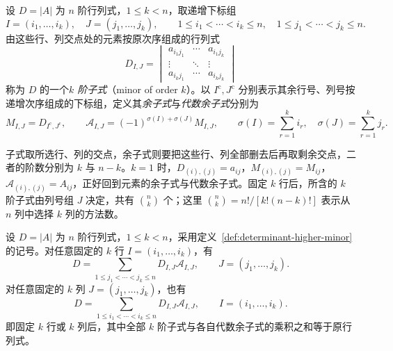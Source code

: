 \begin{definition}
\label{def:determinant-higher-minor}
设 $D=|A|$ 为 $n$ 阶行列式，$1\leq k<n$，取递增下标组
\[
    I=(i_1,\ldots,i_k),\quad J=(j_1,\ldots,j_k),\qquad
    1\leq i_1<\cdots<i_k\leq n,\quad
    1\leq j_1<\cdots<j_k\leq n.
\]
由这些行、列交点处的元素按原次序组成的行列式
\[
    D_{I,J}=\begin{vmatrix}
        a_{i_1j_1}&\cdots&a_{i_1j_k}\\
        \vdots&\ddots&\vdots\\
        a_{i_kj_1}&\cdots&a_{i_kj_k}
    \end{vmatrix}
\]
称为 $D$ 的一个\emph{$k$ 阶子式}（minor of order $k$）。以 $I^{\mathrm c},J^{\mathrm c}$ 分别表示其余行号、列号按递增次序组成的下标组，定义其\emph{余子式}与\emph{代数余子式}分别为
\begin{equation}
\label{eq:determinant-higher-cofactor}
    M_{I,J}=D_{I^{\mathrm c},J^{\mathrm c}},\qquad
    \mathcal A_{I,J}=(-1)^{\sigma(I)+\sigma(J)}M_{I,J},
    \qquad \sigma(I)=\sum_{r=1}^{k}i_r,\quad
           \sigma(J)=\sum_{r=1}^{k}j_r.
\end{equation}
\end{definition}

子式取所选行、列的交点，余子式则要把这些行、列全部删去后再取剩余交点，二者的阶数分别为 $k$ 与 $n-k$。$k=1$ 时，$D_{(i),(j)}=a_{ij}$，$M_{(i),(j)}=M_{ij}$，$\mathcal A_{(i),(j)}=A_{ij}$，正好回到元素的余子式与代数余子式。固定 $k$ 行后，所含的 $k$ 阶子式由列号组 $J$ 决定，共有 $\binom{n}{k}$ 个；这里 $\binom{n}{k}=n!/[k!(n-k)!]$ 表示从 $n$ 列中选择 $k$ 列的方法数。

\begin{theorem}[Laplace 定理]
\label{thm:determinant-laplace}
设 $D=|A|$ 为 $n$ 阶行列式，$1\leq k<n$，采用定义~\ref{def:determinant-higher-minor} 的记号。对任意固定的 $k$ 行 $I=(i_1,\ldots,i_k)$，有
\begin{equation}
\label{eq:determinant-laplace-rows}
    D=\sum_{1\leq j_1<\cdots<j_k\leq n}
       D_{I,J}\mathcal A_{I,J},\qquad J=(j_1,\ldots,j_k).
\end{equation}
对任意固定的 $k$ 列 $J=(j_1,\ldots,j_k)$，也有
\begin{equation}
\label{eq:determinant-laplace-columns}
    D=\sum_{1\leq i_1<\cdots<i_k\leq n}
       D_{I,J}\mathcal A_{I,J},\qquad I=(i_1,\ldots,i_k).
\end{equation}
即固定 $k$ 行或 $k$ 列后，其中全部 $k$ 阶子式与各自代数余子式的乘积之和等于原行列式。
\end{theorem}

